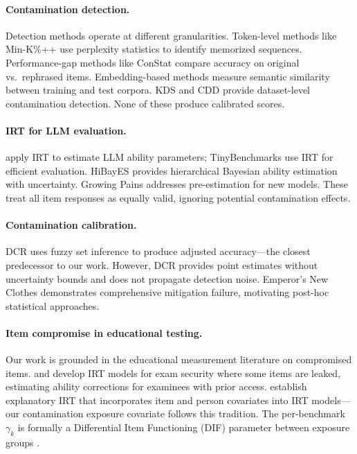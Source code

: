 \documentclass[11pt,a4paper]{article}
\begin{document}
\paragraph{Contamination detection.}
Detection methods operate at different granularities. Token-level methods like Min-K\%++ \citep{shi2024detecting} use perplexity statistics to identify memorized sequences. Performance-gap methods like ConStat \citep{oren2024proving} compare accuracy on original vs.\ rephrased items. Embedding-based methods measure semantic similarity between training and test corpora. KDS \citep{dong2024kds} and CDD \citep{oren2024proving} provide dataset-level contamination detection. None of these produce calibrated scores.

\paragraph{IRT for LLM evaluation.}
\citet{lalor2024aaai} apply IRT to estimate LLM ability parameters; TinyBenchmarks \citep{polo2024tinybenchmarks} use IRT for efficient evaluation. HiBayES provides hierarchical Bayesian ability estimation with uncertainty. Growing Pains \citep{polo2024growingpains} addresses pre-estimation for new models. These treat all item responses as equally valid, ignoring potential contamination effects.

\paragraph{Contamination calibration.}
DCR \citep{dong2024dcr} uses fuzzy set inference to produce adjusted accuracy---the closest predecessor to our work. However, DCR provides point estimates without uncertainty bounds and does not propagate detection noise. Emperor's New Clothes \citep{xu2024benchmarking} demonstrates comprehensive mitigation failure, motivating post-hoc statistical approaches.

\paragraph{Item compromise in educational testing.}
Our work is grounded in the educational measurement literature on compromised items. \citet{eckerly2017} and \citet{sinharay2017} develop IRT models for exam security where some items are leaked, estimating ability corrections for examinees with prior access. \citet{deboeck2004} establish explanatory IRT that incorporates item and person covariates into IRT models---our contamination exposure covariate follows this tradition. The per-benchmark $\gamma_k$ is formally a Differential Item Functioning (DIF) parameter between exposure groups \citep{holland1993,thissen1993,zumbo1999}.
\end{document}
